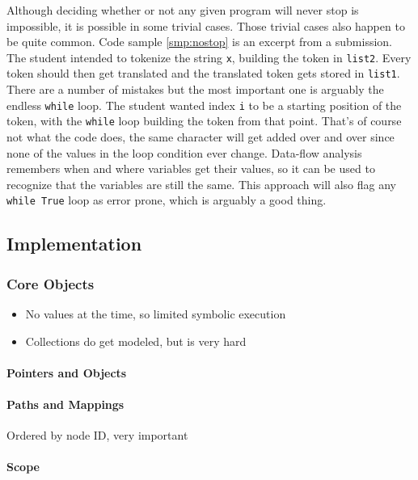 \documentclass[]{article}
\providecommand{\tightlist}{%
  \setlength{\itemsep}{0pt}\setlength{\parskip}{0pt}}
\let\oldparagraph\paragraph
\renewcommand{\paragraph}[1]{\oldparagraph{#1}\mbox{}}
\begin{document}
Although deciding whether or not any given program will never stop is
impossible, it is possible in some trivial cases. Those trivial cases
also happen to be quite common. Code sample \ref{smp:nostop} is an
excerpt from a submission. The student intended to tokenize the string
\texttt{x}, building the token in \texttt{list2}. Every token should
then get translated and the translated token gets stored in
\texttt{list1}. There are a number of mistakes but the most important
one is arguably the endless \texttt{while} loop. The student wanted
index \texttt{i} to be a starting position of the token, with the
\texttt{while} loop building the token from that point. That's of course
not what the code does, the same character will get added over and over
since none of the values in the loop condition ever change. Data-flow
analysis remembers when and where variables get their values, so it can
be used to recognize that the variables are still the same. This
approach will also flag any \texttt{while\ True} loop as error prone,
which is arguably a good thing.

\subsection{Implementation}\label{implementation}

\subsubsection{Core Objects}\label{core-objects}

\begin{itemize}
\tightlist
\item
  No values at the time, so limited symbolic execution
\item
  Collections do get modeled, but is very hard
\end{itemize}

\paragraph{Pointers and Objects}\label{pointers-and-objects}

\paragraph{Paths and Mappings}\label{paths-and-mappings}

Ordered by node ID, very important

\paragraph{Scope}\label{scope}
\end{document}

